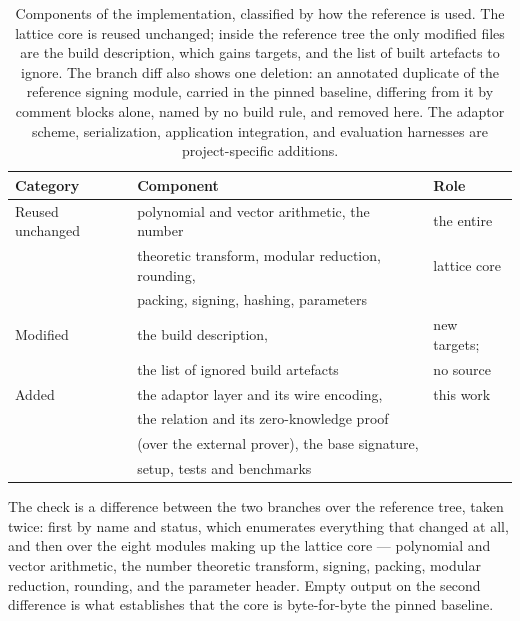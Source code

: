 \begin{table}[htbp]
  \centering
  \caption[Implementation components: reused, modified, and added]{Components of the implementation, classified by how the reference is
  used. The lattice core is reused unchanged; inside the reference tree the only modified files are the build description, which gains targets, and the list of built artefacts to ignore. The branch diff also shows one deletion: an annotated duplicate of the reference signing module, carried in the pinned baseline, differing from it by comment blocks alone, named by no build rule, and removed here. The adaptor scheme, serialization, application integration, and evaluation
  harnesses are project-specific additions.}
  \label{tab:reuse}
  \small
  \begin{tabular}{@{}lll@{}}
    \toprule
    Category & Component & Role \\
    \midrule
    Reused unchanged & polynomial and vector arithmetic, the number & the entire \\
                     & theoretic transform, modular reduction, rounding, & lattice core \\
                     & packing, signing, hashing, parameters & \\
    Modified         & the build description, & new targets; \\
                     & the list of ignored build artefacts & no source \\
    Added            & the adaptor layer and its wire encoding, & this work \\
                     & the relation and its zero-knowledge proof & \\
                     & (over the external prover), the base signature, & \\
                     & setup, tests and benchmarks & \\
    \bottomrule
  \end{tabular}
\end{table}

\FloatBarrier

The check is a difference between the two branches over the reference tree, taken twice:
first by name and status, which enumerates everything that changed at all, and then over
the eight modules making up the lattice core --- polynomial and vector arithmetic, the
number theoretic transform, signing, packing, modular reduction, rounding, and the
parameter header. Empty output on the second difference is what establishes that the core
is byte-for-byte the pinned baseline.

